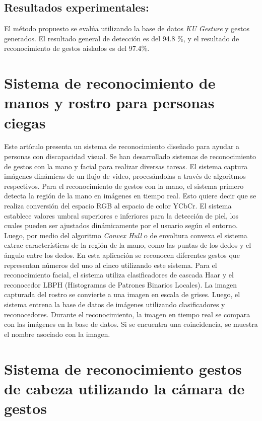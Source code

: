 \subsection*{Resultados experimentales:}
El método propuesto se evalúa utilizando la base de datos \textit{KU Gesture} y gestos generados. El resultado general de detección es del 94.8 \%, y el resultado de reconocimiento de gestos aislados es del 97.4\%. \cite{Lee_2006}

\section*{Sistema de reconocimiento de manos y rostro para personas ciegas}

Este artículo presenta un sistema de reconocimiento diseñado para ayudar a personas con discapacidad visual. Se han desarrollado sistemas de reconocimiento de gestos con la mano y facial para realizar diversas tareas. El sistema captura imágenes dinámicas de un flujo de video, procesándolas a través de algoritmos respectivos. Para el reconocimiento de gestos con la mano, el sistema primero detecta la región de la mano en imágenes en tiempo real. Esto quiere decir que se realiza conversión del espacio RGB al espacio de color YCbCr. El sistema establece valores umbral superiores e inferiores para la detección de piel, los cuales pueden ser ajustados dinámicamente por el usuario según el entorno. Luego, por medio del algoritmo \textit{Convex Hull} o de envoltura convexa el sistema extrae características de la región de la mano, como las puntas de los dedos y el ángulo entre los dedos. En esta aplicación se reconocen diferentes gestos que representan números del uno al cinco utilizando este sistema. Para el reconocimiento facial, el sistema utiliza clasificadores de cascada Haar y el reconocedor LBPH (Histogramas de Patrones Binarios Locales). La imagen capturada del rostro se convierte a una imagen en escala de grises. Luego, el sistema entrena la base de datos de imágenes utilizando clasificadores y reconocedores. Durante el reconocimiento, la imagen en tiempo real se compara con las imágenes en la base de datos. Si se encuentra una coincidencia, se muestra el nombre asociado con la imagen. \cite{Sharma_2019}


\section*{Sistema de reconocimiento gestos de cabeza utilizando la cámara de gestos}

